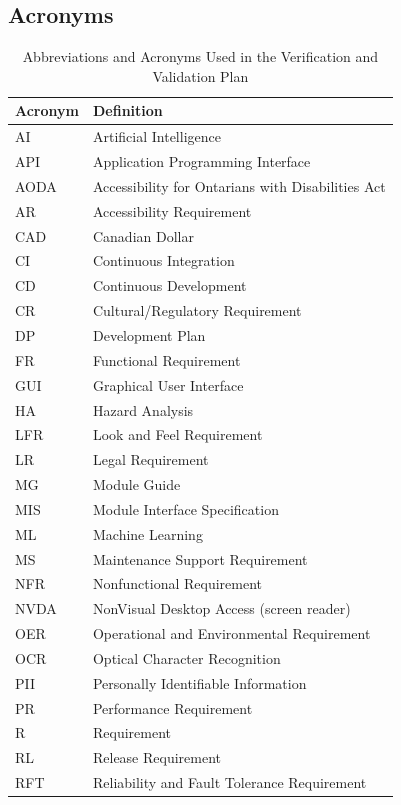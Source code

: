 \documentclass[12pt, titlepage]{article}
\begin{document}
\subsection{Acronyms}
\begin{table}[H]
  \centering
  \caption{Abbreviations and Acronyms Used in the Verification and
  Validation Plan}
  \label{tab:acronyms}
  \begin{tabular}{|l|l|}
    \hline
    \textbf{Acronym} & \textbf{Definition} \\
    \hline
    AI & Artificial Intelligence \\
    API & Application Programming Interface \\
    AODA & Accessibility for Ontarians with Disabilities Act \\
    AR & Accessibility Requirement \\
    CAD & Canadian Dollar \\
    CI & Continuous Integration \\
    CD & Continuous Development \\
    CR & Cultural/Regulatory Requirement \\
    DP & Development Plan \\
    FR & Functional Requirement \\
    GUI & Graphical User Interface \\
    HA & Hazard Analysis \\
    LFR & Look and Feel Requirement \\
    LR & Legal Requirement \\
    MG & Module Guide \\
    MIS & Module Interface Specification \\
    ML & Machine Learning \\
    MS & Maintenance Support Requirement \\
    NFR & Nonfunctional Requirement \\
    NVDA & NonVisual Desktop Access (screen reader) \\
    OER & Operational and Environmental Requirement \\
    OCR & Optical Character Recognition \\
    PII & Personally Identifiable Information \\
    PR & Performance Requirement \\
    R & Requirement \\
    RL & Release Requirement \\
    RFT & Reliability and Fault Tolerance Requirement \\

\end{tabular}
\end{table}
\end{document}
